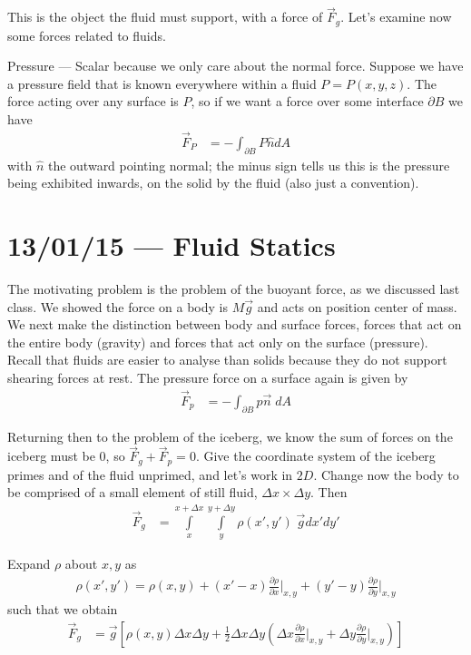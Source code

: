 \documentclass[10pt]{report}
\newcommand{\pd}[2]{\frac{\partial #1}{\partial#2}}
\begin{document}
This is the object the fluid must support, with a force of $\vec{F}_g$. Let's examine now some forces related to fluids.

Pressure --- Scalar because we only care about the normal force. Suppose we have a pressure field that is known everywhere within a fluid $P = P(x,y,z)$. The force acting over any surface is $P$, so if we want a force over some interface $\partial B$ we have
\begin{align}
    \vec{F}_P &= -\int_{\partial B} P\hat{n}dA
\end{align}
with $\hat{n}$ the outward pointing normal; the minus sign tells us this is the pressure being exhibited inwards, on the solid by the fluid (also just a convention). 

\chapter{13/01/15 --- Fluid Statics}

The motivating problem is the problem of the buoyant force, as we discussed last class. We showed the force on a body is $M\vec{g}$ and acts on position center of mass. We next make the distinction between body and surface forces, forces that act on the entire body (gravity) and forces that act only on the surface (pressure). Recall that fluids are easier to analyse than solids because they do not support shearing forces at rest. The pressure force on a surface again is given by 
\begin{align}
    \vec{F}_p &= -\int_{\partial B}p\vec{n}\;dA
\end{align}

Returning then to the problem of the iceberg, we know the sum of forces on the iceberg must be $0$, so $\vec{F}_g + \vec{F}_p = 0$. Give the coordinate system of the iceberg primes and of the fluid unprimed, and let's work in $2D$. Change now the body to be comprised of a small element of still fluid, $\Delta x \times \Delta y$. Then
\begin{align}
    \vec{F}_g &= \int\limits_{x}^{x + \Delta x}\int\limits_{y}^{y + \Delta y}\rho(x',y')\;\vec{g}dx'dy'
\end{align}

Expand $\rho$ about $x,y$ as 
\begin{align}
    \rho(x',y') = \rho(x,y) + (x'-x) \pd{\rho}{x}\Bigg|_{x,y} + \left( y' - y \right)\pd{\rho}{y}\Bigg|_{x,y}
\end{align}
such that we obtain
\begin{align}
    \vec{F}_g &= \vec{g} \left[\rho(x,y) \Delta x \Delta y + \frac{1}{2}\Delta x \Delta y\left( \Delta x\pd{\rho}{x}\Bigg|_{x,y} + \Delta y \pd{\rho}{y}\Bigg|_{x,y}\right)\right]
\end{align}
\end{document}
